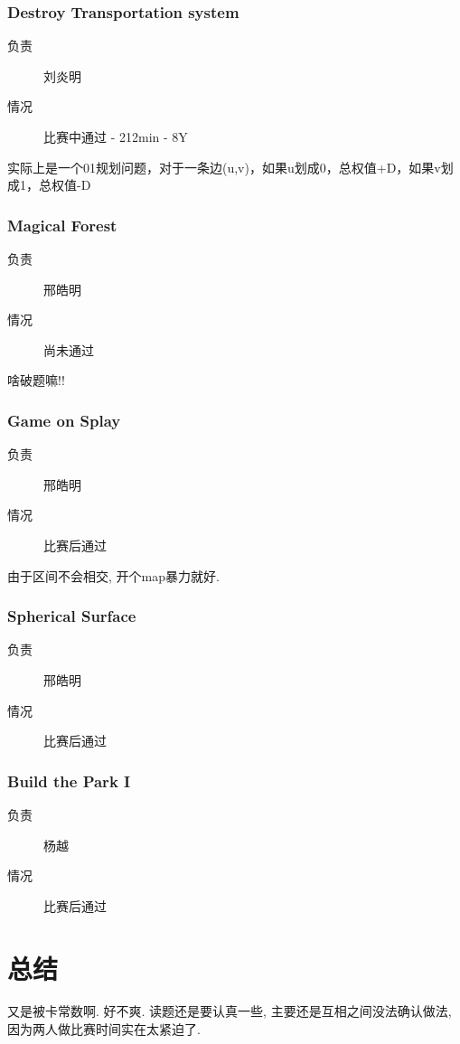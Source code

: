 \documentclass[a4paper, 11pt, nofonts, nocap, fancyhdr]{ctexart}
\newcommand{\problem}[1]{\subsubsection{#1}}
\begin{document}
\problem{Destroy Transportation system}

\begin{description}
\item[负责] 刘炎明
\item[情况] 比赛中通过 - 212min - 8Y
\end{description}

实际上是一个01规划问题，对于一条边(u,v)，如果u划成0，总权值+D，如果v划成1，总权值-D

\problem{Magical Forest}

\begin{description}
\item[负责] 邢皓明
\item[情况] 尚未通过
\end{description}

啥破题嘛!!

\problem{Game on Splay}

\begin{description}
\item[负责] 邢皓明
\item[情况] 比赛后通过
\end{description}

由于区间不会相交, 开个map暴力就好.

\problem{Spherical Surface}

\begin{description}
\item[负责] 邢皓明
\item[情况] 比赛后通过
\end{description}

\problem{Build the Park I}

\begin{description}
\item[负责] 杨越
\item[情况] 比赛后通过
\end{description}

\section{总结}

又是被卡常数啊. 好不爽. 读题还是要认真一些, 主要还是互相之间没法确认做法, 因为两人做比赛时间实在太紧迫了.
\end{document}
